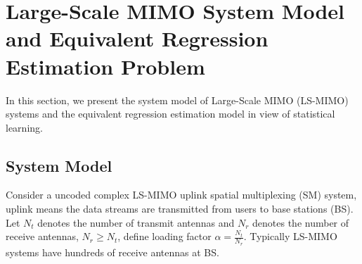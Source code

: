 \documentclass[10pt, draftclsnofoot, onecolumn]{IEEEtran}
\begin{document}
%



\section{Large-Scale MIMO System Model and Equivalent Regression Estimation Problem}
% 
% 
% 
% 

 
In this section, we present the system model of Large-Scale MIMO (LS-MIMO) systems and the equivalent regression estimation model in view of statistical learning. 

\subsection{System Model}
Consider a uncoded complex LS-MIMO uplink spatial multiplexing (SM) system, uplink means the data streams are transmitted from users to base stations (BS). Let $N_{t}$ denotes the number of transmit antennas and $N_{r}$ denotes the number of receive antennas, $N_{r}\geq N_{t}$, define loading factor $\alpha=\frac{N_{t}}{N_{r}}$. Typically LS-MIMO systems have hundreds of receive antennas at BS. 
\end{document}
